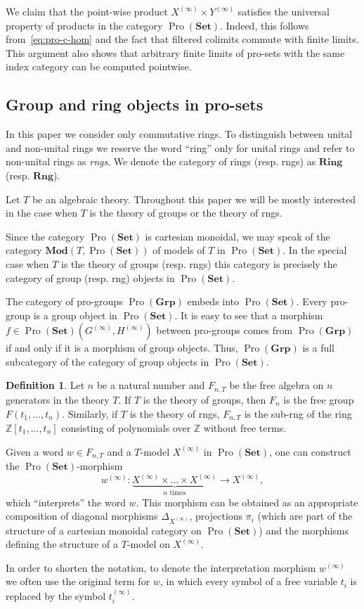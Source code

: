 \documentclass{article}
\numberwithin{equation}{section}
\theoremstyle{definition}
\newtheorem{df}[lemma]{Definition} \Crefname{df}{Definition}{Definitions}
\theoremstyle{remark}
\DeclareMathOperator{\Pro}{Pro}
\newcommand{\Set}{\mathbf{Set}}
\newcommand{\Group}{\mathbf{Grp}}
\newcommand{\Mod}{\mathbf{Mod}}
\begin{document}
We claim that the point-wise product $X^{(\infty)} \times Y^{(\infty)}$ satisfies the universal property of products in the category $\Pro(\Set)$. Indeed, this follows from~\eqref{eq:pro-c-hom} and the fact that filtered colimits commute with finite limits. This argument also shows that arbitrary finite limits of pro-sets with the same index category can be computed pointwise.

\subsection{Group and ring objects in pro-sets}
In this paper we consider only commutative rings.
To distinguish between unital and non-unital rings we reserve the word ``ring'' only for unital rings and refer to non-unital rings as {\it rngs}.
We denote the category of rings (resp. rngs) as $\textbf{Ring}$ (resp. $\textbf{Rng}$).

Let $T$ be an algebraic theory. Throughout this paper we will be mostly interested in the case when $T$ is the theory of groups or the theory of rngs.

Since the category $\Pro(\Set)$ is cartesian monoidal, we may speak of the category $\Mod(T, \Pro(\Set))$ of models of $T$ in \(\Pro(\Set)\).
In the special case when $T$ is the theory of groups (resp. rngs) this category is precisely the category of group (resp. rng) objects in $\Pro(\Set)$.

The category of pro-groups \(\Pro(\Group)\) embeds into \(\Pro(\Set)\). Every pro-group is a group object in \(\Pro(\Set)\). It is easy to see that a morphism \(f \in \Pro(\Set)(G^{(\infty)}, H^{(\infty)})\) between pro-groups comes from \(\Pro(\Group)\) if and only if it is a morphism of group objects. Thus, $\Pro(\Group)$ is a full subcategory of the category of group objects in $\Pro(\Set)$.

\begin{df} \label{df-pro-set-morphisms} 
 Let $n$ be a natural number and $F_{n, T}$ be the free algebra on $n$ generators in the theory $T$.
 If $T$ is the theory of groups, then $F_n$ is the free group $F(t_1,\ldots, t_n)$.
 Similarly, if $T$ is the theory of rngs, $F_{n, T}$ is the sub-rng of the ring $\mathbb{Z}[t_1,\ldots, t_n]$ consisting of polynomials over $\mathbb{Z}$ without free terms.
 
 Given a word $w \in F_{n, T}$ and a $T$-model $X^{(\infty)}$ in $\Pro(\Set)$, one can construct the $\Pro(\Set)$-morphism
 \[ w^{(\infty)} \colon \underbrace{X^{(\infty)} \times \ldots \times X^{(\infty)}}_{n\text{ times}} \to X^{(\infty)}, \]
 which ``interprets'' the word $w$. This morphism can be obtained as an appropriate composition of diagonal morphisms $\Delta_{X^{(\infty)}}$, projections $\pi_i$ 
 (which are part of the structure of a cartesian monoidal category on $\Pro(\Set)$) 
 and the morphisms defining the structure of a $T$-model on $X^{(\infty)}$.
 
 In order to shorten the notation, to denote the interpretation morphism $w^{(\infty)}$ we often use the original term for $w$, in which every symbol of a free variable $t_i$ is replaced by the symbol $t_i^{(\infty)}$.
\end{df}
\end{document}
